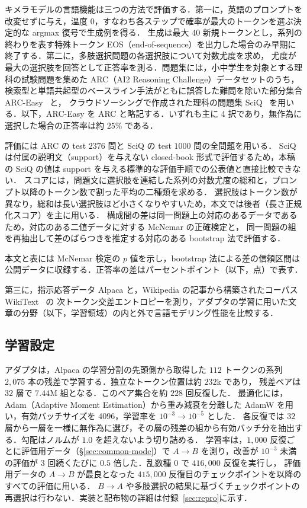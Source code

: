 \documentclass[techrep,noauthor]{ipsj}
\newcommand{\rev}[1]{{\color{blue}#1}}
\newcommand{\revr}[1]{{\color{red}#1}}
\newcommand{\revp}[1]{{\color{violet}#1}}
\newcommand{\revy}[1]{{\color{revyellow}#1}}
\begin{document}
キメラモデルの言語機能は三つの方法で評価する．第一に，英語のプロンプトを改変せずに与え，温度 $0$\rev{，すなわち各ステップで確率が最大のトークンを選ぶ}決定的な argmax 復号で生成例を得る．
生成は最大 $40$ 新規トークンとし，\rev{系列の終わりを表す特殊トークン EOS（end-of-sequence）}を出力した場合のみ早期に終了する．第二に，多肢選択問題の各選択肢について対数尤度を求め，
尤度が最大の選択肢を回答として正答率を測る．問題集には，小中学生を対象とする理科の試験問題を集めた ARC\rev{（AI2 Reasoning Challenge）}データセットのうち，検索型と単語共起型のベースライン手法がともに誤答した難問を除いた部分集合 ARC-Easy~\cite{clark2018thinksolvedquestionanswering} と，
クラウドソーシングで作成された理科の問題集 SciQ~\cite{welbl-etal-2017-crowdsourcing} を用いる．\revr{以下，ARC-Easy を ARC と略記する．いずれも主に 4 択であり，無作為に選択した場合の正答率は約 $25\%$ である．}\rev{

評価には \revp{ARC} の test $2376$ 問と SciQ の test $1000$ 問の全問題を用いる．
SciQ は付属の説明文（support）を与えない closed-book 形式で評価するため，本稿の SciQ の値は support を与える標準的な評価手順での公表値と直接比較できない．
スコアには，問題文に選択肢を連結した系列の対数尤度の総和と，プロンプト以降のトークン数で割った平均の二種類を求める．
選択肢はトークン数が異なり，総和は長い選択肢ほど小さくなりやすいため，本文では後者（長さ正規化スコア）を主に用いる．
構成間の差は同一問題上の対応のあるデータであるため，対応のある二値データに対する McNemar の正確検定と，
同一問題の組を再抽出して差のばらつきを推定する対応のある bootstrap 法で評価する．}\revr{本文と表には McNemar 検定の $p$ 値を示し，bootstrap 法による差の信頼区間は公開データに収録する．正答率の差はパーセントポイント（以下，点）で表す．}

第三に，指示応答データ Alpaca と，Wikipedia の記事から構築されたコーパス WikiText\revp{~\cite{merity2017pointer}} の
次トークン交差エントロピーを測り，\rev{アダプタの学習に用いた文章の分野（以下，学習領域）の内と外で}言語モデリング性能を比較する．

\subsection{\revr{学習設定}}\label{sec:train}
\rev{アダプタは，Alpaca の学習分割の先頭側から取得した $112$ トークンの系列 $2{,}075$ 本の残差で学習する．独立なトークン位置は約 $232$k であり，
残差ペアは $32$ 層で $7.44$M 組となる．このペア集合を約 $228$ 回反復した．
最適化には，Adam（Adaptive Moment Estimation）から重み減衰を分離した AdamW を用い，有効バッチサイズを $4096$，学習率を $10^{-3}\!\to\!10^{-5}$ とした．
\revy{各反復では $32$ 層から一層を一様に無作為に選び，その層の残差の組から有効バッチ分を抽出する．勾配はノルムが $1.0$ を超えないよう切り詰める．}
学習率は，\revy{$1{,}000$ 反復ごとに評価用データ（\S\ref{sec:common-mode}）で $A\!\to\!B$ を測り，改善が $10^{-3}$ 未満の評価が $3$ 回続くたびに} $0.5$ 倍した．乱数種 $0$ で $416{,}000$ 反復を実行し，
評価用データの $A\!\to\!B$ が最良となった $415{,}000$ 反復目のチェックポイントを以降のすべての評価に用いる．
$B\!\to\!A$ や多肢選択の結果に基づくチェックポイントの再選択は行わない．実装と配布物の詳細は付録~\ref{sec:repro}に示す．}
\end{document}
